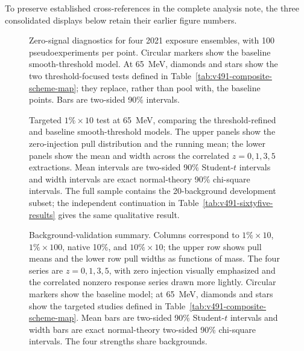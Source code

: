 \ifwritingsample
\else
To preserve established cross-references in the complete analysis note, the three
consolidated displays below retain their earlier figure numbers.
\setcounter{figure}{63}
\fi
\begin{figure}[p]
\centering
{}
\caption{Zero-signal diagnostics for four 2021 exposure ensembles, with 100
pseudoexperiments per point. Circular markers show the baseline smooth-threshold
model. At 65~MeV, diamonds and stars show the two threshold-focused tests defined in
Table~\ref{tab:v491-composite-scheme-map}; they replace, rather than pool with, the
baseline points. Bars are two-sided 90\% intervals.}
\label{fig:v491-zero-signal-full}
\end{figure}

\begin{figure}[p]
\centering
{}
\caption{Targeted $1\%\times10$ test at 65~MeV, comparing the threshold-refined and
baseline smooth-threshold models. The upper panels show the zero-injection pull
distribution and the running mean; the lower panels show the mean and width across
the correlated $z=0,1,3,5$ extractions.  Mean intervals are two-sided 90\%
Student-$t$ intervals and width intervals are exact normal-theory 90\% chi-square
intervals. The full sample contains the 20-background development subset; the
independent continuation in Table~\ref{tab:v491-sixtyfive-results} gives the same
qualitative result.}
\label{fig:v491-sixtyfive-confirmation}
\end{figure}

\begin{figure}[p]
\centering
{}
\caption{Background-validation summary. Columns correspond to
$1\%\times10$, $1\%\times100$, native 10\%, and $10\%\times10$; the upper row
shows pull means and the lower row pull widths as functions of mass.  The four series
are $z=0,1,3,5$, with zero injection visually emphasized and the correlated nonzero
response series drawn more lightly. Circular markers show the baseline model; at
65~MeV, diamonds and stars show the targeted studies defined in
Table~\ref{tab:v491-composite-scheme-map}. Mean bars are
two-sided 90\% Student-$t$ intervals and width bars are exact normal-theory two-sided
90\% chi-square intervals. The four strengths share backgrounds.}
\label{fig:v491-pull-summary}
\end{figure}

